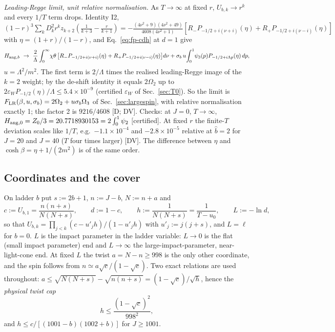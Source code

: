 \emph{Leading-Regge limit, unit relative normalisation.} As $T\to\infty$ at fixed $r$, $U_{b,k}\to r^k$ and every $1/T$ term drops.
Identity I2, $(1-r)^3\sum_kD_k^2r^kz_{k+2}(\frac1{k+3}-\frac r{k+1})=-\frac{(4\nu^2+9)(4\nu^2+49)}{4608(4\nu^2+1)}[R_-P_{-1/2+i(\nu+i)}(\eta)
+R_+P_{-1/2+i(\nu-i)}(\eta)]$ with $\eta=(1+r)/(1-r)$, and Eq.~\eqref{eq:fp-cdh} at $d=1$ give
\begin{equation}
H_{{\rm ang},b}\ \to\ \frac2\Lambda\int_0^\infty\!\chi\theta\,\big[R_-P_{-1/2+i(\nu+i)}(\eta)+R_+P_{-1/2+i(\nu-i)}(\eta)\big]d\nu
+\sigma_b\,u\!\int_0^1\!\psi_3(p)P_{-1/2+i\Lambda p}(\eta)\,dp ,
\label{eq:fp-LR}
\end{equation}
$u=\Lambda^2/m^2$. The first term is $2/\Lambda$ times the realised leading-Regge image of the $k=2$ weight; by the de-shift identity it
equals $2\Omega_2$ up to $2\varepsilon_WP_{-1/2}(\eta)/\Lambda\le5.4\times10^{-9}$ (certified $\varepsilon_W$ of Sec.~\ref{sec:T0}).
So the limit is $F_{\rm LR}(\beta,u,\sigma_b)=2\Omega_2+u\sigma_b\Omega_3$ of Sec.~\ref{sec:largespin}, with relative normalisation
exactly 1; the factor 2 is $9216/4608$ [D; DV]. Checks: at $J=0$, $T\to\infty$, $H_{{\rm ang},0}=Z_0/3=20.7718930153=2\int_0^1\psi_2$
[certified]. At fixed $r$ the finite-$T$ deviation scales like $1/T$, e.g.\ $-1.1\times10^{-4}$ and $-2.8\times10^{-5}$ relative at
$\hat b=2$ for $J=20$ and $J=40$ ($T$ four times larger) [DV]. The difference between $\eta$ and $\cosh\beta=\eta+1/(2m^2)$ is of the
same order.

\subsection{Coordinates and the cover}
On ladder $b$ put $s:=2b+1$, $n:=J-b$, $N:=n+a$ and
\begin{equation}
c:=U_{b,1}=\frac{n(n+s)}{N(N+s)},\qquad d:=1-c,\qquad h:=\frac1{N(N+s)}=\frac1{T-u_0},\qquad L:=-\ln d ,
\label{eq:fp-cdh-coords}
\end{equation}
so that $U_{b,k}=\prod_{j<k}(c-u'_jh)/(1-u'_jh)$ with $u'_j:=j(j+s)$, and $L=\ell$ for $b=0$. $L$ is the impact parameter in the
ladder variable: $L\to0$ is the flat (small impact parameter) end and $L\to\infty$ the large-impact-parameter, near-light-cone end.
At fixed $L$ the twist $a=N-n\ge998$ is the only other coordinate, and the spin follows from $n\simeq a\sqrt c/(1-\sqrt c)$. Two
exact relations are used throughout: $a\le\sqrt{N(N+s)}-\sqrt{n(n+s)}=(1-\sqrt c)/\sqrt h$, hence the \emph{physical twist cap}
\begin{equation}
h\le\frac{(1-\sqrt c)^2}{998^2},
\label{eq:fp-cap}
\end{equation}
and $h\le c/[(1001-b)(1002+b)]$ for $J\ge1001$.

